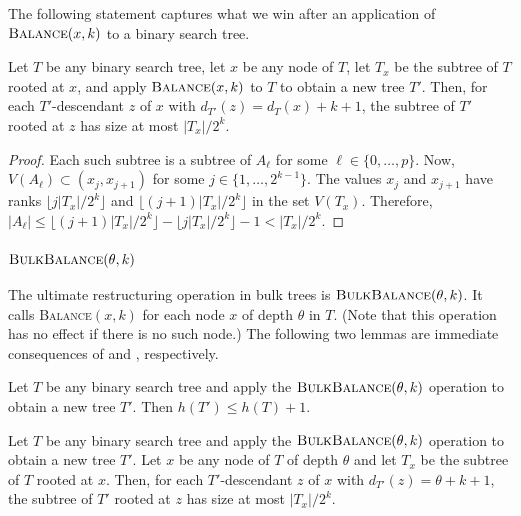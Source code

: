 \documentclass[kpfonts]{patmorin}
\let\le\leqslant
\begin{document}
The following statement captures what we win after an application of $\textsc{Balance}(x,k)$ to a binary search tree.

\begin{lem}
  Let $T$ be any binary search tree, let $x$ be any node of $T$, let $T_x$ be the subtree of $T$ rooted at $x$, and apply $\textsc{Balance}(x,k)$ to $T$ to obtain a new tree $T'$.  Then, for each $T'$-descendant $z$ of $x$ with $d_{T'}(z) = d_{T}(x)+k+1$, the subtree of $T'$ rooted at $z$ has size at most $|T_x|/2^k$.  \end{lem}

\begin{proof}
  Each such subtree is a subtree of $A_\ell$ for some $\ell\in\{0,\dots,p\}$. Now, $V(A_\ell)\subset (x_j,x_{j+1})$ for some $j\in\{1,\dots,2^{k-1}\}$.  The values $x_j$ and $x_{j+1}$ have ranks $\lfloor j|T_x|/2^k\rfloor$ and $\lfloor (j+1)|T_x|/2^k\rfloor$ in the set $V(T_x)$.  Therefore, $|A_\ell|\le \lfloor (j+1)|T_x|/2^k\rfloor- \lfloor j|T_x|/2^k\rfloor -1 < |T_x|/2^k$.
\end{proof}

\subsubsection{$\textsc{BulkBalance}(\theta,k)$}

The ultimate restructuring operation in bulk trees is $\textsc{BulkBalance}(\theta,k)$.
It calls \textsc{Balance}$(x,k)$ for each node $x$ of depth $\theta$ in $T$.
(Note that this operation has no effect if there is no such node.)
The following two lemmas are immediate consequences of  and , respectively.

\begin{lem}
  Let $T$ be any binary search tree and apply the $\textsc{BulkBalance}(\theta,k)$ operation to obtain a new tree $T'$.  Then $h(T')\le h(T)+1$.
\end{lem}

\begin{lem}
  Let $T$ be any binary search tree and apply the $\textsc{BulkBalance}(\theta,k)$ operation to obtain a new tree $T'$.
  Let $x$ be any node of $T$ of depth $\theta$ and let $T_x$ be the subtree of $T$ rooted at $x$.
  Then, for each $T'$-descendant $z$ of $x$ with $d_{T'}(z) = \theta+k+1$, the subtree of $T'$ rooted at $z$ has size at most $|T_x|/2^k$.
\end{lem}
\end{document}
